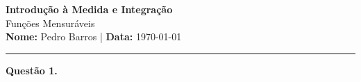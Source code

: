 \documentclass[12pt, a4paper]{article}
\newenvironment{solution}[1]{\par\vspace{1.2em}\noindent\textbf{Questão #1.}}{\par\vspace{0.5em}}
\begin{document}
\thispagestyle{empty} %
\begin{center}
    {\Large \textbf{Introdução à Medida e Integração}} \\[0.4em]
    {\large Funções Mensuráveis} \\[0.4em]
    \textbf{Nome:} Pedro Barros \quad | \quad \textbf{Data:} \today
\end{center}

\hrule
\vspace{1.5em}

\begin{solution}{1}

\end{solution}
\end{document}
